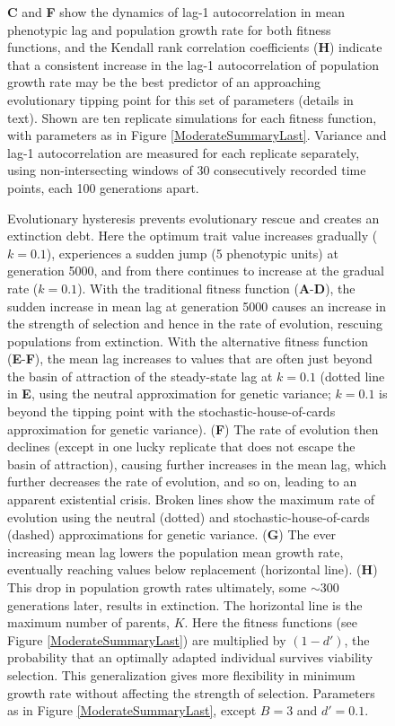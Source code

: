 \documentclass[12pt,letterpaper]{article} %
\begin{document}
\begin{figure}[!ht]
{\textbf{C} and \textbf{F} show the dynamics of lag-1 autocorrelation in mean phenotypic lag and population growth rate for both fitness functions, and the Kendall rank correlation coefficients (\textbf{H}) indicate that a consistent increase in the lag-1 autocorrelation of population growth rate may be the best predictor of an approaching evolutionary tipping point for this set of parameters (details in text).
Shown are ten replicate simulations for each fitness function, with parameters as in Figure \ref{ModerateSummaryLast}.
Variance and lag-1 autocorrelation are measured for each replicate separately, using non-intersecting windows of 30 consecutively recorded time points, each 100 generations apart.
}
\label{ModerateWarnings}
\end{figure}

\begin{figure}[!ht]
\centering
\caption{
Evolutionary hysteresis prevents evolutionary rescue and creates an extinction debt.
Here the optimum trait value increases gradually ($k=0.1$), experiences a sudden jump (5 phenotypic units) at generation 5000, and from there continues to increase at the gradual rate ($k=0.1$).  
With the traditional fitness function (\textbf{A}-\textbf{D}), the sudden increase in mean lag at generation 5000 causes an increase in the strength of selection and hence in the rate of evolution, rescuing populations from extinction.
With the alternative fitness function (\textbf{E}-\textbf{F}), the mean lag increases to values that are often just beyond the basin of attraction of the steady-state lag at $k=0.1$ (dotted line in \textbf{E}, using the neutral approximation for genetic variance; $k=0.1$ is beyond the tipping point with the stochastic-house-of-cards approximation for genetic variance).
(\textbf{F}) The rate of evolution then declines (except in one lucky replicate that does not escape the basin of attraction), causing further increases in the mean lag, which further decreases the rate of evolution, and so on, leading to an apparent existential crisis.
Broken lines show the maximum rate of evolution using the neutral (dotted) and stochastic-house-of-cards (dashed) approximations for genetic variance.
(\textbf{G}) The ever increasing mean lag lowers the population mean growth rate, eventually reaching values below replacement (horizontal line).
(\textbf{H}) This drop in population growth rates ultimately, some $\sim$300 generations later, results in extinction.
The horizontal line is the maximum number of parents, $K$.
Here the fitness functions (see Figure \ref{ModerateSummaryLast}) are multiplied by $(1-d')$, the probability that an optimally adapted individual survives viability selection.
This generalization gives more flexibility in minimum growth rate without affecting the strength of selection.
Parameters as in Figure \ref{ModerateSummaryLast}, except $B=3$ and $d'=0.1$.
}
\label{HysteresisSnapshot}
\end{figure}
\end{document}
